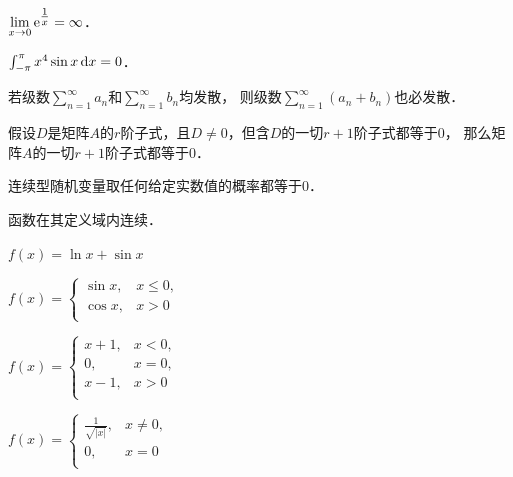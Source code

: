 \documentclass[plain,noanswer,medmath]{../../template/jnuexam}
\begin{document}




\begin{problem}
$\lim_{x \to 0} \e^{\tfrac{1}{x}} = \infty$．\tickout{}
\end{problem}


\begin{problem}
$\int_{-\pi}^{\pi} x^4\sin x\mathop{}\!\mathrm{d} x = 0$．\tickout{}
\end{problem}


\begin{problem}
若级数$\sum_{n = 1}^{\infty}a_n$和$\sum_{n = 1}^{\infty}b_n$均发散，
则级数$\sum_{n = 1}^{\infty}(a_n + b_n)$也必发散．\tickout{}
\end{problem}


\begin{problem}
假设$D$是矩阵$A$的$r$阶子式，且$D \ne 0$，但含$D$的一切$r + 1$阶子式都等于$0$，
那么矩阵$A$的一切$r + 1$阶子式都等于$0$．\tickout{}
\end{problem}


\begin{problem}
连续型随机变量取任何给定实数值的概率都等于$0$．\tickout{}
\end{problem}




\begin{problem}
函数\pickin{}在其定义域内连续．
\begin{abcd}
\item $f(x) = \ln x + \sin x$
\item $f(x) = \begin{cases}
  \sin x, & x \le 0, \\
  \cos x, & x > 0 \\
\end{cases}$
\item $f(x) = \begin{cases}
  x + 1, &  x < 0, \\
      0, &  x = 0, \\
  x - 1, &  x > 0 \\
\end{cases}$
\item $f(x) = \begin{cases}
  \frac{1}{\sqrt{|x|}}, & x \ne 0, \\
                     0, & x = 0 \\
\end{cases}$
\end{abcd}
\end{problem}
\end{document}
